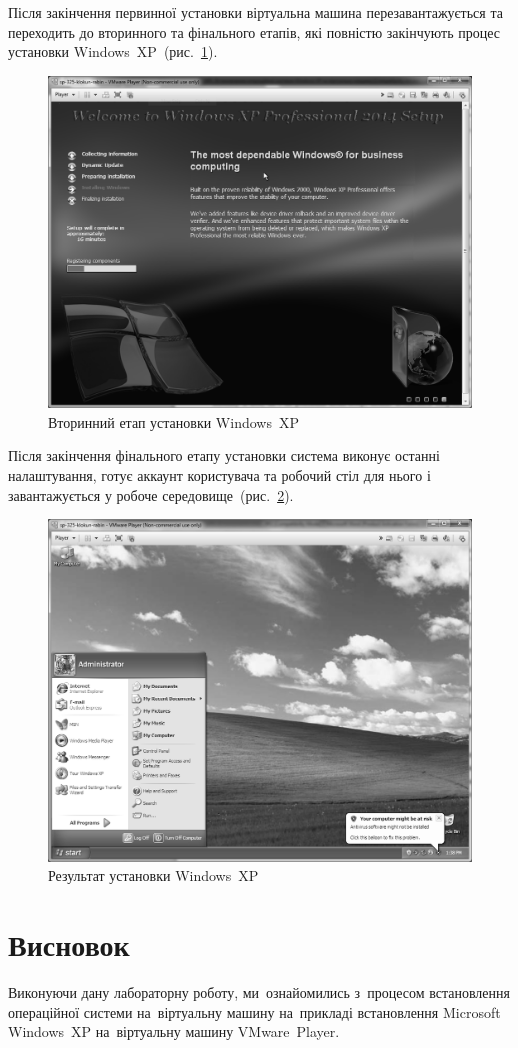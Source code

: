 \documentclass[
	a4paper,
	oneside,
	DIV = 12,
	12pt,
	headings = normal,
]{scrartcl}
\begin{document}
		Після закінчення первинної установки віртуальна машина перезавантажується та переходить до вторинного та фінального етапів, які повністю закінчують процес установки Windows~XP~(рис.~\ref{fig:02-winxp-install-secondary}).
		\begin{figure}[!htb]
			\centering
			\includegraphics[height = 10\baselineskip]{./assets/y03s01-pcdiag-lab-01-02-bw.png}
			\caption{Вторинний етап установки Windows~XP}
			\label{fig:02-winxp-install-secondary}
		\end{figure}

		Після закінчення фінального етапу установки система виконує останні налаштування, готує аккаунт користувача та робочий стіл для нього і завантажується у робоче середовище~(рис.~\ref{fig:03-winxp-install-desktop}).
		\begin{figure}[!htb]
			\centering
			\includegraphics[height = 10\baselineskip]{./assets/y03s01-pcdiag-lab-01-03-bw.png}
			\caption{Результат установки Windows~XP}
			\label{fig:03-winxp-install-desktop}
		\end{figure}

	\section{Висновок}
		Виконуючи дану лабораторну роботу, ми~ознайомились з~процесом встановлення операційної системи на~віртуальну машину на~прикладі встановлення Microsoft Windows~XP на~віртуальну машину VMware~Player.
\end{document}
